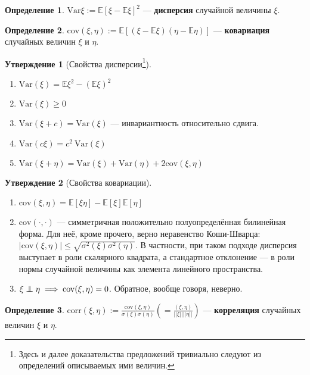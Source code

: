 \documentclass[11pt,a4paper]{report}
\def\E{\mathbb{E}}
\def\Var{\mathrm{Var}}
\def\Cov{\mathrm{cov}}
\def\Corr{\mathrm{corr}}
\newcommand\independent{\protect\mathpalette{\protect\independenT}{\perp}}
\def\independenT#1#2{\mathrel{\rlap{$#1#2$}\mkern2mu{#1#2}}}
\theoremstyle{definition}
\theoremstyle{definition}
\newtheorem{preposition}{Утверждение}[section]
\theoremstyle{definition}
\newtheorem{definition}{Определение}[section]
\begin{document}
		\begin{definition}
			$ \Var \xi := \E[\xi - \E\xi]^{2} $ — \textbf{дисперсия} случайной величины $ \xi $.
		\end{definition}
		\begin{definition}
			$ \Cov(\xi, \eta) := \E[(\xi - \E\xi)(\eta - \E\eta)] $ — \textbf{ковариация} случайных величин $ \xi $ и $ \eta $. 
		\end{definition}
		\begin{preposition}[Свойства дисперсии\footnote{Здесь и далее доказательства предложений тривиально следуют из определений описываемых ими величин.}]$  $
			\begin{enumerate}
				\item $ \Var(\xi) = \E \xi^{2} - (\E \xi)^{2} $
				\item $ \Var(\xi) \ge 0 $
				\item $ \Var(\xi + c) = \Var(\xi) $ — инвариантность относительно сдвига.
				\item $ \Var(c \xi) = c^{2}\ \Var(\xi) $
				\item $ \Var(\xi + \eta) = \Var(\xi) + \Var(\eta) + 2\Cov(\xi, \eta) $
			\end{enumerate}
		\end{preposition}
		\begin{preposition}[Свойства ковариации]$  $
			\begin{enumerate}
				\item $ \Cov(\xi, \eta) = \E[\xi \eta] - \E[\xi]\E[\eta] $
				\item $ \Cov(\cdot, \cdot) $ — симметричная положительно полуопределённая билинейная  форма. Для неё, кроме прочего, верно неравенство Коши-Шварца: $ |\Cov(\xi, \eta)| \le \sqrt{\sigma^{2}(\xi) \sigma^{2}(\eta)} $. В частности, при таком подходе дисперсия выступает в роли скалярного квадрата, а стандартное отклонение — в роли нормы случайной величины как элемента линейного пространства. 
				\item $ \xi \independent \eta \implies \Cov(\xi, \eta) = 0 $. Обратное, вообще говоря, неверно.
			\end{enumerate}
		\end{preposition}
		\begin{definition}
			$ \Corr(\xi, \eta) := \frac{\Cov(\xi, \eta)}{\sigma(\xi) \sigma(\eta)} \left (= \frac{(\xi, \eta)}{||\xi|| ||\eta||}\right ) $ — \textbf{корреляция} случайных величин $ \xi $ и $ \eta $. 
		\end{definition}
\end{document}
